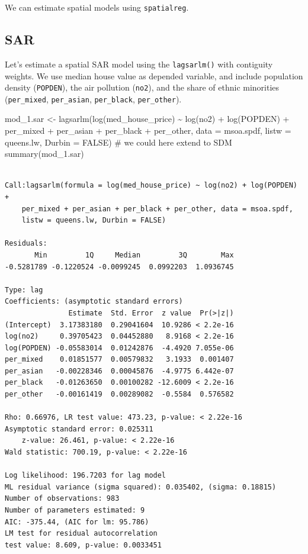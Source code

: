 \documentclass[
  letterpaper,
]{scrbook}
\newenvironment{Shaded}{\begin{snugshade}}{\end{snugshade}}
\newcommand{\AttributeTok}[1]{\textcolor[rgb]{0.40,0.45,0.13}{#1}}
\newcommand{\CommentTok}[1]{\textcolor[rgb]{0.37,0.37,0.37}{#1}}
\newcommand{\ConstantTok}[1]{\textcolor[rgb]{0.56,0.35,0.01}{#1}}
\newcommand{\FunctionTok}[1]{\textcolor[rgb]{0.28,0.35,0.67}{#1}}
\newcommand{\NormalTok}[1]{\textcolor[rgb]{0.00,0.23,0.31}{#1}}
\newcommand{\OtherTok}[1]{\textcolor[rgb]{0.00,0.23,0.31}{#1}}
\newcommand{\SpecialCharTok}[1]{\textcolor[rgb]{0.37,0.37,0.37}{#1}}
\begin{document}
We can estimate spatial models using \texttt{spatialreg}.

\hypertarget{sar}{%
\subsection{SAR}\label{sar}}

Let's estimate a spatial SAR model using the \texttt{lagsarlm()} with
contiguity weights. We use median house value as depended variable, and
include population density (\texttt{POPDEN}), the air pollution
(\texttt{no2}), and the share of ethnic minorities (\texttt{per\_mixed},
\texttt{per\_asian}, \texttt{per\_black}, \texttt{per\_other}).

\begin{Shaded}
\begin{Highlighting}[]
\NormalTok{mod\_1.sar }\OtherTok{\textless{}{-}} \FunctionTok{lagsarlm}\NormalTok{(}\FunctionTok{log}\NormalTok{(med\_house\_price) }\SpecialCharTok{\textasciitilde{}} \FunctionTok{log}\NormalTok{(no2) }\SpecialCharTok{+} \FunctionTok{log}\NormalTok{(POPDEN) }\SpecialCharTok{+} 
\NormalTok{                        per\_mixed }\SpecialCharTok{+}\NormalTok{ per\_asian }\SpecialCharTok{+}\NormalTok{ per\_black }\SpecialCharTok{+}\NormalTok{ per\_other,  }
                      \AttributeTok{data =}\NormalTok{ msoa.spdf, }
                      \AttributeTok{listw =}\NormalTok{ queens.lw,}
                      \AttributeTok{Durbin =} \ConstantTok{FALSE}\NormalTok{) }\CommentTok{\# we could here extend to SDM}
\FunctionTok{summary}\NormalTok{(mod\_1.sar)}
\end{Highlighting}
\end{Shaded}

\begin{verbatim}

Call:lagsarlm(formula = log(med_house_price) ~ log(no2) + log(POPDEN) + 
    per_mixed + per_asian + per_black + per_other, data = msoa.spdf, 
    listw = queens.lw, Durbin = FALSE)

Residuals:
       Min         1Q     Median         3Q        Max 
-0.5281789 -0.1220524 -0.0099245  0.0992203  1.0936745 

Type: lag 
Coefficients: (asymptotic standard errors) 
               Estimate  Std. Error  z value  Pr(>|z|)
(Intercept)  3.17383180  0.29041604  10.9286 < 2.2e-16
log(no2)     0.39705423  0.04452880   8.9168 < 2.2e-16
log(POPDEN) -0.05583014  0.01242876  -4.4920 7.055e-06
per_mixed    0.01851577  0.00579832   3.1933  0.001407
per_asian   -0.00228346  0.00045876  -4.9775 6.442e-07
per_black   -0.01263650  0.00100282 -12.6009 < 2.2e-16
per_other   -0.00161419  0.00289082  -0.5584  0.576582

Rho: 0.66976, LR test value: 473.23, p-value: < 2.22e-16
Asymptotic standard error: 0.025311
    z-value: 26.461, p-value: < 2.22e-16
Wald statistic: 700.19, p-value: < 2.22e-16

Log likelihood: 196.7203 for lag model
ML residual variance (sigma squared): 0.035402, (sigma: 0.18815)
Number of observations: 983 
Number of parameters estimated: 9 
AIC: -375.44, (AIC for lm: 95.786)
LM test for residual autocorrelation
test value: 8.609, p-value: 0.0033451
\end{verbatim}
\end{document}
